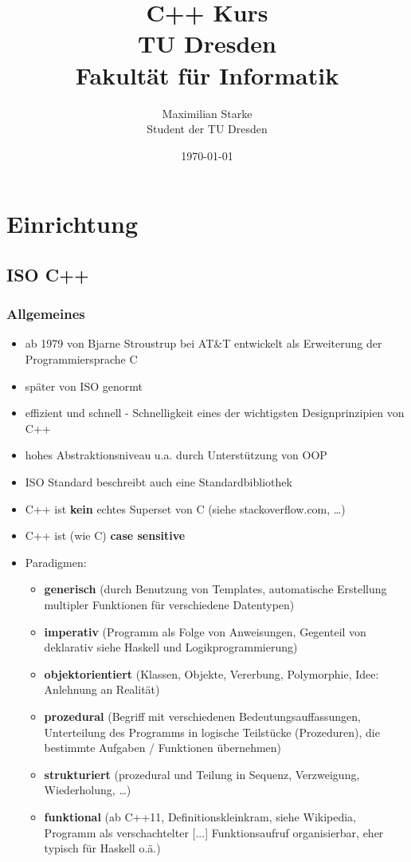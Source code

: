 \documentclass[a4paper]{report}
\title{C++ Kurs\\TU Dresden\\Fakultät für Informatik}
\author{Maximilian Starke \\ Student der TU Dresden}
\date{\today}
\begin{document}
	

\maketitle
\tableofcontents

\chapter{Einrichtung}

\section{ISO C++}

\subsection{Allgemeines}
\begin{itemize}
\item ab 1979 von Bjarne Stroustrup bei AT\&T entwickelt als Erweiterung der Programmiersprache C
\item später von ISO genormt
\vspace{2ex}
\item effizient und schnell - Schnelligkeit eines der wichtigsten Designprinzipien von C++
\item hohes Abstraktionsniveau u.a. durch Unterstützung von OOP
\item ISO Standard beschreibt auch eine Standardbibliothek
\item C++ ist \textbf{kein} echtes Superset von C (siehe stackoverflow.com, \dots)
\item C++ ist (wie C) \textbf{case sensitive}
\vspace{2ex}

\item Paradigmen:
	\begin{itemize}
		\item \textbf{generisch} (durch Benutzung von Templates, automatische Erstellung multipler Funktionen für verschiedene Datentypen)
		\item \textbf{imperativ} (Programm als Folge von Anweisungen, Gegenteil von deklarativ siehe Haskell und Logikprogrammierung)
		\item \textbf{objektorientiert} (Klassen, Objekte, Vererbung, Polymorphie, Idee: Anlehnung an Realität)
		\item \textbf{prozedural} (Begriff mit verschiedenen Bedeutungsauffassungen, Unterteilung des Programms in logische Teilstücke (Prozeduren), die bestimmte Aufgaben / Funktionen übernehmen)
		\item \textbf{strukturiert} (prozedural und Teilung in Sequenz, Verzweigung, Wiederholung, \dots )
		\item \textbf{funktional} (ab C++11, Definitionskleinkram, siehe Wikipedia, Programm als verschachtelter [...] Funktionsaufruf 	organisierbar, eher typisch für Haskell o.ä.)
	\end{itemize}
\end{itemize}
\end{document}
